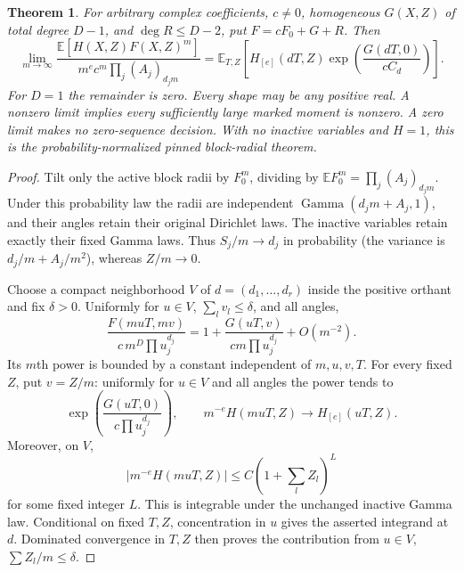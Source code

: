 \documentclass[11pt]{article}
\newtheorem{theorem}{Theorem}
\newcommand{\E}{\mathbb E}
\begin{document}
\begin{theorem}\label{thm:block}
For arbitrary complex coefficients, $c\ne0$, homogeneous $G(X,Z)$ of
\emph{total} degree $D-1$, and $\deg R\leq D-2$, put
$F=cF_0+G+R$. Then
\[
 \lim_{m\to\infty}
 \frac{\E[H(X,Z)F(X,Z)^m]}{m^e c^m\prod_j(A_j)_{d_jm}}
 =\E_{T,Z}\left[H_{[e]}(dT,Z)
 \exp\!\left(\frac{G(dT,0)}{cC_d}\right)\right]. \tag{1}
\]
For $D=1$ the remainder is zero. Every shape may be any positive real.
A nonzero limit implies every sufficiently large marked moment is nonzero.
A zero limit makes no zero-sequence decision. With no inactive variables
and $H=1$, this is the probability-normalized pinned block-radial theorem.
\end{theorem}
\begin{proof}
Tilt only the active block radii by $F_0^m$, dividing by
$\E F_0^m=\prod_j(A_j)_{d_jm}$. Under this probability law the radii
are independent $\operatorname{Gamma}(d_jm+A_j,1)$, and their angles
retain their original Dirichlet laws. The inactive variables retain
exactly their fixed Gamma laws. Thus $S_j/m\to d_j$ in probability
(the variance is $d_j/m+A_j/m^2$), whereas $Z/m\to0$.

Choose a compact neighborhood $V$ of $d=(d_1,\ldots,d_r)$ inside
the positive orthant and fix $\delta>0$. Uniformly for $u\in V$,
$\sum_l v_l\leq\delta$, and all angles,
\[
 \frac{F(muT,mv)}{c\,m^D\prod u_j^{d_j}}
 =1+\frac{G(uT,v)}{cm\prod u_j^{d_j}}+O(m^{-2}).
\]
Its $m$th power is bounded by a constant independent of $m,u,v,T$.
For every fixed $Z$, put $v=Z/m$: uniformly for $u\in V$ and all
angles the power tends to
\[
 \exp\!\left(\frac{G(uT,0)}{c\prod u_j^{d_j}}\right),
 \qquad m^{-e}H(muT,Z)\longrightarrow H_{[e]}(uT,Z).
\]
Moreover, on $V$,
\[
 |m^{-e}H(muT,Z)|\leq C(1+\textstyle\sum_l Z_l)^L
\]
for some fixed integer $L$. This is integrable under the unchanged
inactive Gamma law. Conditional on fixed $T,Z$, concentration in $u$
gives the asserted integrand at $d$. Dominated convergence in $T,Z$
then proves the contribution from $u\in V$, $\sum Z_l/m\leq\delta$.


\end{proof}
\end{document}

